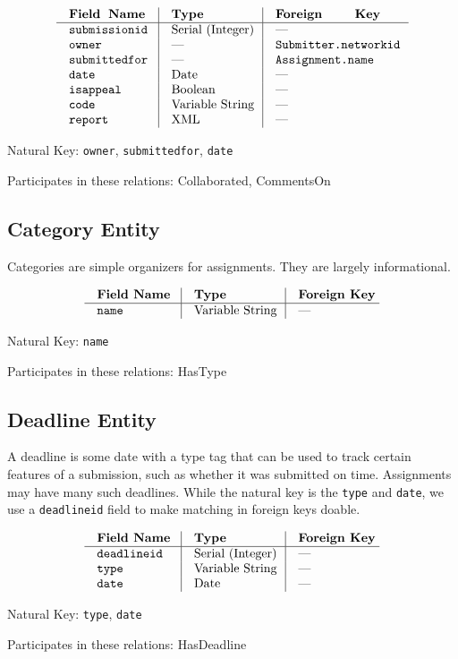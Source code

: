 $$\vbox{
  \offinterlineskip
  \halign{
    \strut \quad {\tt #}  & \vrule\quad #  & \vrule\quad # \cr
    {\bf Field Name}  & {\bf Type}  & {\bf Foreign Key}\cr
    \noalign{\hrule}    
    submissionid & Serial (Integer) & --- \cr
    owner  & ---  & {\tt Submitter.networkid} \cr
    submittedfor  & ---  & {\tt Assignment.name} \cr
    date  & Date  & --- \cr
    isappeal  & Boolean  & --- \cr
    code  & Variable String  & --- \cr
    report  & XML  & --- \cr
  }
}$$

{\noindent
Natural Key: {\tt owner}, {\tt submittedfor}, {\tt date}\par\noindent
Participates in these relations: Collaborated, CommentsOn \par}

\subsection{Category Entity}
Categories are simple organizers for assignments. 
They are largely informational.

$$\vbox{
  \offinterlineskip
  \halign{
    \strut \quad {\tt #}  & \vrule\quad #  & \vrule\quad # \cr
    {\bf Field Name}  & {\bf Type}  & {\bf Foreign Key}\cr
    \noalign{\hrule}    
    name  & Variable String  & --- \cr
  }
}$$

{\noindent
Natural Key: {\tt name}\par\noindent
Participates in these relations: HasType \par}

\subsection{Deadline Entity}
A deadline is some date with a type tag that can be used to track certain
features of a submission, such as whether it was submitted on time.
Assignments may have many such deadlines. While the natural key is 
the {\tt type} and {\tt date}, we use a {\tt deadlineid} field to make 
matching in foreign keys doable.

$$\vbox{
  \offinterlineskip
  \halign{
    \strut \quad {\tt #}  & \vrule\quad #  & \vrule\quad # \cr
    {\bf Field Name}  & {\bf Type}  & {\bf Foreign Key}\cr
    \noalign{\hrule}
    deadlineid & Serial (Integer) & --- \cr
    type  & Variable String  & --- \cr
    date  & Date  & --- \cr
  }
}$$

{\noindent
Natural Key: {\tt type}, {\tt date}\par\noindent
Participates in these relations: HasDeadline \par}

